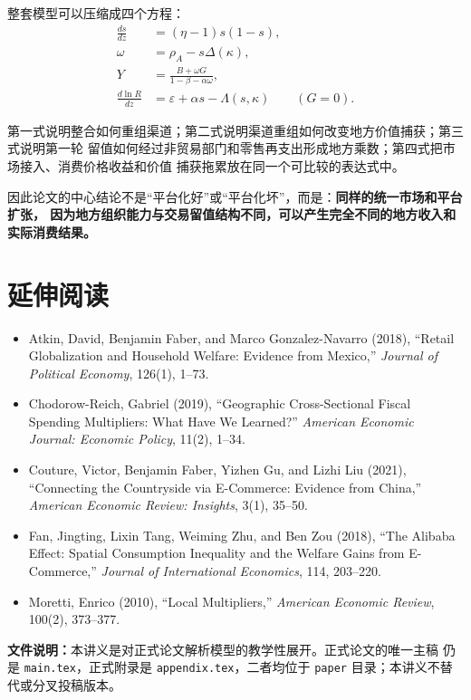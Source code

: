 \documentclass[UTF8,11pt,scheme=chinese,fontset=fandol]{ctexart}
\theoremstyle{definition}
\begin{document}
整套模型可以压缩成四个方程：
\begin{align*}
\frac{ds}{dz}&=(\eta-1)s(1-s),\\
\omega&=\rho_A-s\Delta(\kappa),\\
Y&=\frac{B+\omega G}{1-\beta-\alpha\omega},\\
\frac{d\ln R}{dz}&=\varepsilon+\alpha s-\Lambda(s,\kappa)\qquad(G=0).
\end{align*}

第一式说明整合如何重组渠道；第二式说明渠道重组如何改变地方价值捕获；第三式说明第一轮
留值如何经过非贸易部门和零售再支出形成地方乘数；第四式把市场接入、消费价格收益和价值
捕获拖累放在同一个可比较的表达式中。

因此论文的中心结论不是“平台化好”或“平台化坏”，而是：\textbf{同样的统一市场和平台扩张，
因为地方组织能力与交易留值结构不同，可以产生完全不同的地方收入和实际消费结果。}

\section*{延伸阅读}

\begin{itemize}
  \item Atkin, David, Benjamin Faber, and Marco Gonzalez-Navarro (2018),
  ``Retail Globalization and Household Welfare: Evidence from Mexico,''
  \emph{Journal of Political Economy}, 126(1), 1--73.
  \item Chodorow-Reich, Gabriel (2019), ``Geographic Cross-Sectional Fiscal Spending
  Multipliers: What Have We Learned?'' \emph{American Economic Journal: Economic Policy},
  11(2), 1--34.
  \item Couture, Victor, Benjamin Faber, Yizhen Gu, and Lizhi Liu (2021),
  ``Connecting the Countryside via E-Commerce: Evidence from China,''
  \emph{American Economic Review: Insights}, 3(1), 35--50.
  \item Fan, Jingting, Lixin Tang, Weiming Zhu, and Ben Zou (2018),
  ``The Alibaba Effect: Spatial Consumption Inequality and the Welfare Gains from
  E-Commerce,'' \emph{Journal of International Economics}, 114, 203--220.
  \item Moretti, Enrico (2010), ``Local Multipliers,'' \emph{American Economic Review},
  100(2), 373--377.
\end{itemize}

\bigskip
\noindent\textbf{文件说明：}本讲义是对正式论文解析模型的教学性展开。正式论文的唯一主稿
仍是 \texttt{main.tex}，正式附录是 \texttt{appendix.tex}，二者均位于 \texttt{paper}
目录；本讲义不替代或分叉投稿版本。
\end{document}
